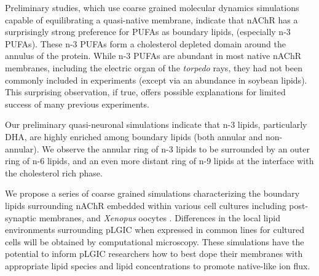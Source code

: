 \documentclass{article}
\begin{document}
Preliminary studies, which use coarse grained molecular dynamics simulations capable of equilibrating a quasi-native membrane, indicate that nAChR has a surprisingly strong preference for PUFAs as boundary lipids, (especially n-3 PUFAs). These n-3 PUFAs form a cholesterol depleted domain around the annulus of the protein. While n-3 PUFAs are abundant in most native nAChR membranes, including the electric organ of the \textit{torpedo} rays, they had not been commonly included in experiments (except via an abundance in soybean lipids). This surprising observation, if true, offers possible explanations for limited success of many previous experiments.



Our preliminary quasi-neuronal simulations indicate that n-3 lipids, particularly DHA, are highly enriched among boundary lipids (both annular and non-annular). We observe the annular ring of n-3 lipids to be surrounded by an outer ring of n-6 lipids, and an even more distant ring of n-9 lipids at the interface with the cholesterol rich phase.

We propose a series of coarse grained simulations characterizing the boundary lipids surrounding nAChR embedded within various cell cultures including post-synaptic membranes, and \textit{Xenopus} oocytes \cite{Lindi2001,Gamba2005}. Differences in the local lipid environments surrounding pLGIC when expressed in common lines for cultured cells will be obtained by computational microscopy. These simulations have the potential to inform pLGIC researchers how to best dope their membranes with appropriate lipid species and lipid concentrations to promote native-like ion flux.
\end{document}
